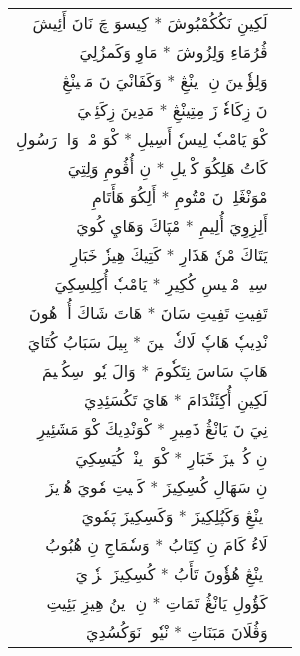 \documentclass[a4paper, 12pt]{report}
\begin{document}
\begin{longtable}{rl}
\textarabic{لَكِينِ نَكُكُمْبُوشَ  *  كِيسوَ چَ نَانَ أَئِيشَ} & \\ 
\textarabic{ڤُرُمَاءِ وَلِزُوشَ  *  مَاوِ وَكَمزُلِيَ} & \\ 
[8mm] 

\textarabic{وَلِؤٗنٖينَ نِ وٖينْڠِ  *  وَكَفَانْيَ نَ مَڠٖينْڠِ} & \\ 
\textarabic{نَ زِكَاءٗ زَ مِتِينْڠِ  *  مَدِينَ زِكَئِنٖيَ} & \\ 
[8mm] 

\textarabic{كْوَ يَامْبٗ لِيسٗ أَسِيلِ  *  كْوَ مْكٖ وَاكٖ رَسُولِ} & \\ 
\textarabic{كَاتُ هَلِكُوَ كْوٖيلِ  *  نِ أُڤُومِ وَلِتِيَ} & \\ 
[8mm] 

\textarabic{مْوَنْڠَلِيٖ نَ مْتُومِ  *  أَلِكُوَ هَأَتَامِ} & \\ 
\textarabic{أَلِزِوِيَ أُلِيمِ  *  مْپَاكَ وَهَايِ كُويَ} & \\ 
[8mm] 

\textarabic{يَتَاكَ مْنٗ هَذَارِ  *  كَتِيكَ هِيزٗ خَبَارِ} & \\ 
\textarabic{سِيوٖ مْپٖيسِ كُكِيرِ  *  يَامْبٗ أُكِلِسِكِيَ} & \\ 
[8mm] 

\textarabic{تَفِيتِ تَفِيتِ سَانَ  *  هَاتَ شَاكَ أُوٖ هُونَ} & \\ 
\textarabic{نْدِيپٗ هَاپٗ لَاكٗ نٖينَ  *  بِيلَ سَبَابُ كُتَايَ} & \\ 
[8mm] 

\textarabic{هَاپَ سَاسَ نِتَكٗومَ  *  وَالَ يٗوتٖ سِكُسٖيمَ} & \\ 
\textarabic{لَكِينِ أُكِئَنْدَامَ  *  هَايَ تَكُسَئِدِيَ} & \\ 
[8mm] 

\textarabic{نِيَ نَ يَانْڠُ ذَمِيرِ  *  كْوَنْدِيكَ كْوَ مَشَئِيرِ} & \\ 
\textarabic{نِ كُئٖنٖيزَ خَبَارِ  *  كْوَ وٖينْيٖ كُيَسِكِيَ} & \\ 
[8mm] 

\textarabic{نِ سَهَالِ كُسِكِيزَ  *  كَسٖيتِ مٗويَ هُوٖيزَ} & \\ 
\textarabic{وٖينْڠِ وَكَپُلِكِيزَ  *  وَكَسِكِيزَ پَمٗويَ} & \\ 
[8mm] 

\textarabic{لَاءُ كَامَ نِ كِتَابُ  *  وَسٗمَاجِ نِ هُبُوبُ} & \\ 
\textarabic{وٖينْڠِ هُؤٗونَ تَأَبُ  *  كُسِكِيزَ مٖزٗوٖيَ} & \\ 
[8mm] 

\textarabic{كَؤُولِ يَانْڠُ تَمَاتِ  *  نِ زٖينُ هِيزِ بَئِيتِ} & \\ 
\textarabic{وَڤُلَانَ مَبَنَاتِ  *  نْيٗوتٖ نَوَكُسُدِيَ} & \\ 
[8mm] 


\end{longtable}
\end{document}
